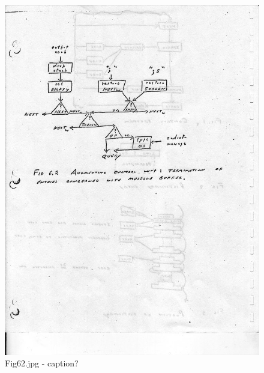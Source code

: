 \documentclass[b5paper, oneside]{book}
\begin{document}
\begin{figure}[ht!]
\centering
\includegraphics[width=140mm]{Fig62.jpg}
\caption{Fig62.jpg - caption?\label{exampleLabel2}}
\end{figure}
\end{document}
